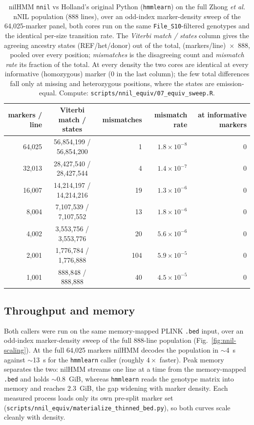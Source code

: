 \documentclass[11pt]{article}
\newcommand{\code}[1]{\texttt{#1}}
\providecommand{\nnil}{\texttt{nnil}\xspace}
\begin{document}
\begin{table}[htbp]
\centering
\small
\begin{tabular}{@{}r c r r r@{}}
\toprule
markers / line & Viterbi match / states & mismatches & mismatch rate & at informative markers \\
\midrule
64{,}025 & 56{,}854{,}199 / 56{,}854{,}200 & 1   & $1.8\times10^{-8}$ & 0 \\
32{,}013 & 28{,}427{,}540 / 28{,}427{,}544 & 4   & $1.4\times10^{-7}$ & 0 \\
16{,}007 & 14{,}214{,}197 / 14{,}214{,}216 & 19  & $1.3\times10^{-6}$ & 0 \\
8{,}004  & 7{,}107{,}539 / 7{,}107{,}552   & 13  & $1.8\times10^{-6}$ & 0 \\
4{,}002  & 3{,}553{,}756 / 3{,}553{,}776   & 20  & $5.6\times10^{-6}$ & 0 \\
2{,}001  & 1{,}776{,}784 / 1{,}776{,}888   & 104 & $5.9\times10^{-5}$ & 0 \\
1{,}001  & 888{,}848 / 888{,}888           & 40  & $4.5\times10^{-5}$ & 0 \\
\bottomrule
\end{tabular}
\caption{nilHMM \nnil vs Holland's original Python (\code{hmmlearn}) on the
full Zhong \emph{et al.} nNIL population (888 lines), over an odd-index
marker-density sweep of the 64{,}025-marker panel, both cores run on the same
\code{File\_S10}-filtered genotypes and the identical per-size transition rate. The
\emph{Viterbi match / states} column gives the agreeing ancestry states
(REF/het/donor) out of the total, (markers/line)~$\times$~888, pooled over every
position; \emph{mismatches} is the disagreeing count and \emph{mismatch rate} its
fraction of the total. At every density the two
cores are identical at every informative (homozygous) marker (0 in the last column);
the few total differences fall only at missing and heterozygous positions, where the
states are emission-equal. Compute: \code{scripts/nnil\_equiv/07\_equiv\_sweep.R}.}
\label{tab:nnil-equiv}
\end{table}

\subsection{Throughput and memory}
Both callers were run on the same memory-mapped PLINK \code{.bed} input, over an
odd-index marker-density sweep of the full 888-line population
(Fig.~\ref{fig:nnil-scaling}). At the full 64{,}025 markers nilHMM decodes the
population in $\sim$4~s against $\sim$13~s for the \code{hmmlearn} caller (roughly
$4\times$ faster). Peak memory separates the two: nilHMM streams one line at a time
from the memory-mapped \code{.bed} and holds $\sim$0.8~GiB, whereas \code{hmmlearn}
reads the genotype matrix into memory and reaches $2.3$~GiB, the gap widening with
marker density. Each measured process loads only its own pre-split marker set
(\code{scripts/nnil\_equiv/materialize\_thinned\_bed.py}), so both curves scale
cleanly with density.
\end{document}
